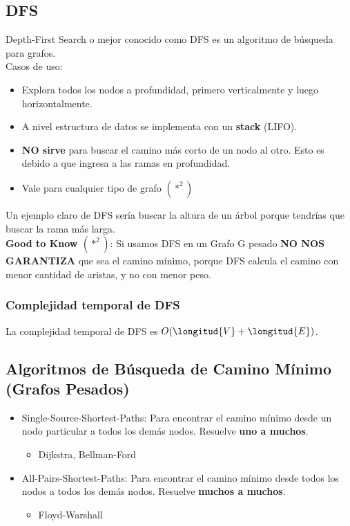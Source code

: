 \documentclass[10pt,a4paper]{article}
\begin{document}
\subsection*{DFS}
Depth-First Search o mejor conocido como DFS es un algoritmo de búsqueda para grafos. \\
Casos de uso: 
\begin{itemize}
    \item Explora todos los nodos a profundidad, primero verticalmente y luego horizontalmente.
    \item A nivel estructura de datos se implementa con un \textbf{stack} (LIFO).
    \item \textbf{NO sirve} para buscar el camino más corto de un nodo al otro. Esto es debido a que ingresa a las ramas en profundidad.
    \item Vale para cualquier tipo de grafo $(*^{2})$
\end{itemize}
Un ejemplo claro de DFS sería buscar la altura de un árbol porque tendrías que buscar la rama más larga. \\
\textbf{Good to Know $(*^{2})$}: Si usamos DFS en un Grafo G pesado \textbf{NO NOS GARANTIZA} que sea el camino mínimo, porque DFS calcula el camino con menor cantidad de aristas, y no con menor peso. 
\subsubsection*{Complejidad temporal de DFS}
La complejidad temporal de DFS es $O(\longitud{V} + \longitud{E})$.
\subsection*{Algoritmos de Búsqueda de Camino Mínimo (Grafos Pesados)}
\begin{itemize}
    \item Single-Source-Shortest-Paths: Para encontrar el camino mínimo desde un nodo particular a todos los demás nodos. Resuelve \textbf{uno a muchos}.
    \begin{itemize}
        \item Dijkstra, Bellman-Ford
    \end{itemize}
    \item All-Pairs-Shortest-Paths: Para encontrar el camino mínimo desde todos los nodos a todos los demás nodos. Resuelve \textbf{muchos a muchos}.
    \begin{itemize}
        \item Floyd-Warshall
    \end{itemize}
\end{itemize}
\end{document}
